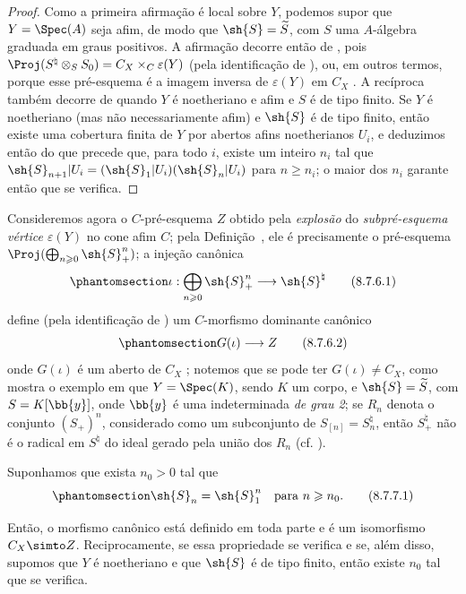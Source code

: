 \documentclass[oneside,10pt]{amsart}
\makeatletter
\renewcommand{\geq}{\geqslant}
\newcommand{\ega@arrow}[2]{\mathchoice{#1}{#2}{#2}{#2}}
\renewcommand{\to}{\ega@arrow{\longrightarrow}{\rightarrow}}
\newcommand{\oldpage}[2][]{\marginnote{\normalfont\footnotesize\textbf{#1}~|~#2}\ignorespaces}
\let\EGAOriginalLabel\label
\renewcommand{\label}[1]{\phantomsection\EGAOriginalLabel{#1}}
\makeatother
\begin{document}
\begin{proof}
Como a primeira afirmação é local sobre $Y$, podemos supor que $Y=\Spec(A)$ seja afim, de modo que $\sh{S}=\widetilde{S}$, com $S$ uma $A$-álgebra graduada em graus positivos.
A afirmação decorre então de , pois $\Proj(S^\natural\otimes_S S_0) = C_X\times_C\varepsilon(Y)$ (pela identificação de ), ou, em outros termos, porque esse pré-esquema é a imagem inversa de $\varepsilon(Y)$ em $C_X$ .
A recíproca também decorre de  quando $Y$ é noetheriano e afim e $S$ é de tipo finito.
\oldpage[II]{177}
Se $Y$ é noetheriano (mas não necessariamente afim) e $\sh{S}$ é de tipo finito, então existe uma cobertura finita de $Y$ por abertos afins noetherianos $U_i$, e deduzimos então do que precede que, para todo $i$, existe um inteiro $n_i$ tal que $\sh{S}_{n+1}|U_i = (\sh{S}_1|U_i)(\sh{S}_n|U_i)$ para $n\geq n_i$;
o maior dos $n_i$ garante então que  se verifica.
\end{proof}
\begin{env}[8.7.6]
\label{II.8.7.6}
Consideremos agora o $C$-pré-esquema $Z$ obtido pela \emph{explosão} do \emph{subpré-esquema vértice $\varepsilon(Y)$} no cone afim $C$;
pela Definição~, ele é precisamente o pré-esquema $\Proj(\bigoplus_{n\geq0}\sh{S}_+^n)$;
a injeção canônica
\[
\label{II.8.7.6.1}
  \iota: \bigoplus_{n\geq0} \sh{S}_+^n \to \sh{S}^\natural
\tag{8.7.6.1}
\]
define (pela identificação de ) um $C$-morfismo dominante canônico
\[
\label{II.8.7.6.2}
  G(\iota)\to Z
  \tag{8.7.6.2}
\]
onde $G(\iota)$ é um aberto de $C_X$ ;
notemos que se pode ter $G(\iota)\neq C_X$, como mostra o exemplo em que $Y=\Spec(K)$, sendo $K$ um corpo, e $\sh{S}=\widetilde{S}$, com $S=K[\bb{y}]$, onde $\bb{y}$ é uma indeterminada \emph{de grau 2};
se $R_n$ denota o conjunto $(S_+)^n$, considerado como um subconjunto de $S_{[n]}=S_n^\natural$, então $S_+^\natural$ não é o radical em $S^\natural$ do ideal gerado pela união dos $R_n$ (cf. ).
\end{env}
\begin{corollary}[8.7.7]
\label{II.8.7.7}
Suponhamos que exista $n_0>0$ tal que
\[
\label{II.8.7.7.1}
  \sh{S}_n=\sh{S}_1^n
  \quad
  \text{para }n\geq n_0.
  \tag{8.7.7.1}
\]

Então, o morfismo canônico  está definido em toda parte e é um isomorfismo $C_X\simto Z$.
Reciprocamente, se essa propriedade se verifica e se, além disso, supomos que $Y$ é noetheriano e que $\sh{S}$ é de tipo finito, então existe $n_0$ tal que  se verifica.
\end{corollary}
\end{document}
